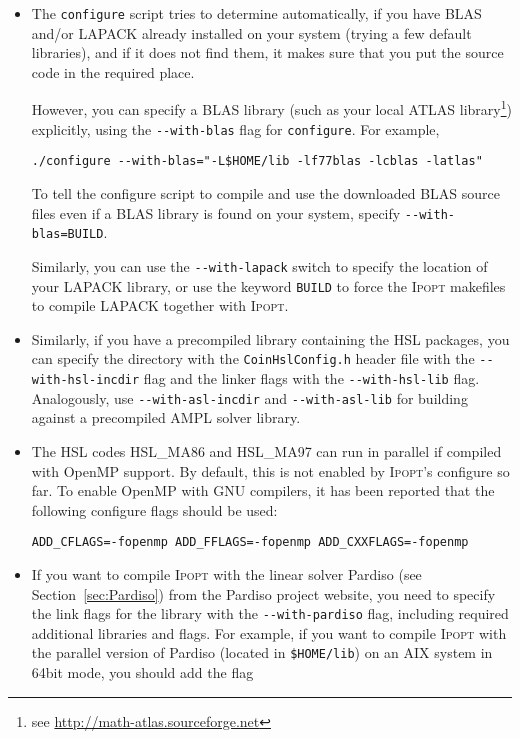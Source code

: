 \documentclass[10pt]{article}
\newcommand{\Ipopt}{\textsc{Ipopt}\xspace}
\begin{document}
\begin{itemize}
\item The {\tt configure} script tries to determine automatically, if
  you have BLAS and/or LAPACK already installed on your system (trying
  a few default libraries), and if it does not find them, it makes
  sure that you put the source code in the required place.

  However, you can specify a BLAS library (such as your local ATLAS
  library\footnote{see \url{http://math-atlas.sourceforge.net}})
  explicitly, using the \verb/--with-blas/ flag for {\tt configure}.
  For example,

  \verb|./configure --with-blas="-L$HOME/lib -lf77blas -lcblas -latlas"| %

  To tell the configure script to compile and use the downloaded BLAS
  source files even if a BLAS library is found on your system, specify
  \verb|--with-blas=BUILD|.

  Similarly, you can use the \verb/--with-lapack/ switch to specify
  the location of your LAPACK library, or use the keyword {\tt BUILD}
  to force the \Ipopt makefiles to compile LAPACK together with
  \Ipopt.

\item Similarly, if you have a precompiled library containing the
  HSL packages, you can specify the directory with the
  \texttt{CoinHslConfig.h} header file with the \verb|--with-hsl-incdir| flag and
  the linker flags with the \verb|--with-hsl-lib| flag. 
  Analogously, use \verb|--with-asl-incdir| and \verb|--with-asl-lib| for
  building against a precompiled AMPL solver library.
  
\item The HSL codes HSL\_MA86 and HSL\_MA97 can run in parallel if 
compiled with OpenMP support. By default, this is not enabled by 
\Ipopt's configure so far. To enable OpenMP with GNU compilers, it 
has been reported that the following configure flags should be used:

  \verb|ADD_CFLAGS=-fopenmp ADD_FFLAGS=-fopenmp ADD_CXXFLAGS=-fopenmp|

\item If you want to compile \Ipopt with the linear solver Pardiso
  (see Section~\ref{sec:Pardiso}) from the Pardiso project website,
  you need to specify the link flags
  for the library with the \verb|--with-pardiso| flag, including
  required additional libraries and flags.  For example, if you want
  to compile \Ipopt with the parallel version of Pardiso (located in
  {\tt \$HOME/lib}) on an AIX system in 64bit mode, you should add the
  flag


\end{itemize}
\end{document}

